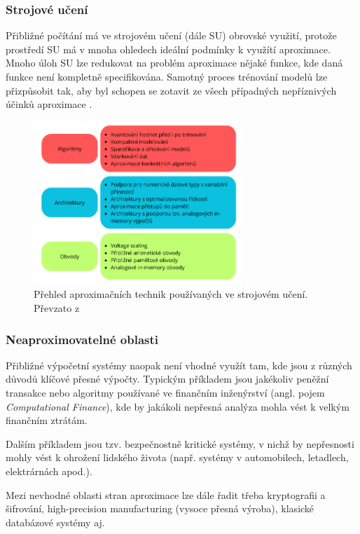 \subsubsection{Strojové učení}
Přibližné počítání má ve strojovém učení (dále SU) obrovské využití, protože prostředí SU má v mnoha ohledech ideální podmínky k využítí aproximace. Mnoho úloh SU lze redukovat na problém aproximace nějaké funkce, kde daná funkce není kompletně specifikována. Samotný proces trénování modelů lze přizpůsobit tak, aby byl schopen se zotavit ze všech případných nepříznivých účinků aproximace \cite{approx_ai}.

\begin{figure}[H]
    \centering
    \includegraphics[width=0.7\textwidth]{obrazky-figures/ml.png}
    \caption{Přehled aproximačních technik používaných ve strojovém učení. Převzato z \cite{approx_ai}}
    \label{fig:enter-label}
\end{figure}

\subsubsection{Neaproximovatelné oblasti}
Přibližné výpočetní systémy naopak není vhodné využít tam, kde jsou z různých důvodů klíčové přesné výpočty. Typickým příkladem jsou jakékoliv peněžní transakce nebo algoritmy používané ve finančním inženýrství (angl. pojem \textit{Computational Finance}), kde by jakákoli nepřesná analýza mohla vést k velkým finančním ztrátám.

Dalším příkladem jsou tzv. bezpečnostně kritické systémy, v nichž by nepřesnosti mohly vést k ohrožení lidského života (např. systémy v automobilech, letadlech, elektrárnách apod.).

Mezi nevhodné oblasti stran aproximace lze dále řadit třeba kryptografii a šifrování, high-precision manufacturing (vysoce přesná výroba), klasické databázové systémy aj.

